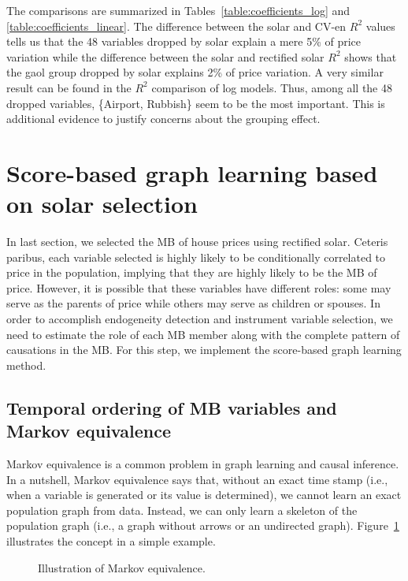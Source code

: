 \documentclass[11pt,review,authoryear]{elsarticle}
\begin{document}
The comparisons are summarized in Tables~\ref{table:coefficients_log} and \ref{table:coefficients_linear}. The difference between the solar and CV-en $R^2$ values tells us that the 48 variables dropped by solar explain a mere 5\% of price variation while the difference between the solar and rectified solar $R^2$ shows that the gaol group dropped by solar explains 2\% of price variation. A very similar result can be found in the $R^2$ comparison of log models. Thus, among all the 48 dropped variables, \{Airport, Rubbish\} seem to be the most important. This is additional evidence to justify concerns about the grouping effect.

\section{Score-based graph learning based on solar selection}

In last section, we selected the MB of house prices using rectified solar. Ceteris paribus, each variable selected is highly likely to be conditionally correlated to price in the population, implying that they are highly likely to be the MB of price. However, it is possible that these variables have different roles: some may serve as the parents of price while others may serve as children or spouses. In order to accomplish endogeneity detection and instrument variable selection, we need to estimate the role of each MB member along with the complete pattern of causations in the MB. For this step, we implement the score-based graph learning method.

\subsection{Temporal ordering of MB variables and Markov equivalence}

Markov equivalence is a common problem in graph learning and causal inference. In a nutshell, Markov equivalence says that, without an exact time stamp (i.e., when a variable is generated or its value is determined), we cannot learn an exact population graph from data. Instead, we can only learn a skeleton of the population graph (i.e., a graph without arrows or an undirected graph). Figure~\ref{fig:Markov_Equi} illustrates the concept in a simple example.

\begin{figure}[H]
  \centering
  \hfil
  \hfil

  \hfil
  \caption{Illustration of Markov equivalence.}
  \label{fig:Markov_Equi}
\end{figure}
\end{document}
